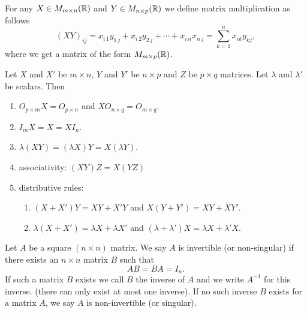 \documentclass[10pt, a4paper]{article}
\begin{document}
\begin{definition}
    For any $X \in M_{m \times n}(\mathbb{R})$ and $Y \in M_{n \times p}(\mathbb{R})$ we define matrix multiplication as follows
    \[
    (XY)_{ij} = x_{i\,1}y_{1\,j} + x_{i\,2}y_{2\,j} + \dotsi + x_{i\,n}x_{n\,j} = \sum_{k = 1}^{n}{x_{ik}y_{kj}},
    \]
    where we get a matrix of the form $M_{m \times p}(\mathbb{R})$.
\end{definition}

\begin{proposition}
    Let $X$ and $X'$ be $m \times n$, $Y$ and $Y'$ be $n \times p$ and $Z$ be $p \times q$ matrices. Let $\lambda$ and $\lambda'$ be scalars. Then
    \begin{enumerate}[label = (\roman*)]
        \item $O_{p \times m}X = O_{p \times n}$ and $XO_{n \times q} = O_{m \times q}$.
        \item $I_{m}X = X = XI_n$.
        \item $\lambda(XY) = (\lambda X)Y = X(\lambda Y)$.
        \item associativity: $(XY)Z = X(YZ)$
        \item distributive rules:
        \begin{enumerate}[label = (\alph*)]
            \item $(X + X')Y = XY + X'Y$ and $X(Y + Y') = XY + XY'$.
            \item $\lambda(X + X') = \lambda X + \lambda X'$ and $(\lambda + \lambda')X = \lambda X + \lambda' X$.
        \end{enumerate}
    \end{enumerate}
\end{proposition}

\begin{definition}
    Let $A$ be a square $(n\times n)$ matrix. We say $A$ is invertible (or non-singular) if there exists an $n \times n$ matrix $B$ such that
    \[
    AB = BA = I_n.
    \]
    If such a matrix $B$ exists we call $B$ the inverse of $A$ and we write $A ^ {-1}$ for this inverse. (there can only exist at most one inverse).
    If no such inverse $B$ exists for a matrix $A$, we say $A$ is non-invertible (or singular).
\end{definition}
\end{document}
